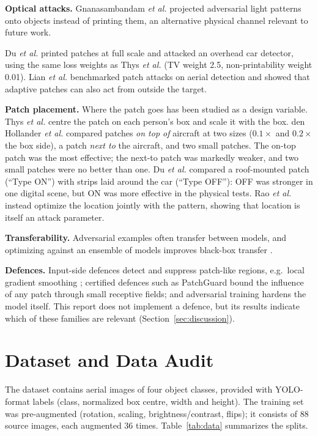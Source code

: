 \documentclass[conference]{IEEEtran}
\begin{document}
\textbf{Optical attacks.} Gnanasambandam \emph{et al.} \cite{gnanasambandam2021optical}
projected adversarial light patterns onto objects instead of printing them, an alternative
physical channel relevant to future work.

Du \emph{et al.} \cite{du2022physical} printed patches at full scale and attacked an overhead
car detector, using the same loss weights as Thys \emph{et al.} (TV weight 2.5,
non-printability weight 0.01). Lian \emph{et al.} \cite{lian2022benchmarking} benchmarked
patch attacks on aerial detection and showed that adaptive patches can also act from outside
the target.

\textbf{Patch placement.} Where the patch goes has been studied as a design variable. Thys
\emph{et al.} \cite{thys2019fooling} centre the patch on each person's box and scale it with
the box. den Hollander \emph{et al.} \cite{denhollander2020adversarial} compared patches
\emph{on top of} aircraft at two sizes ($0.1\times$ and $0.2\times$ the box side), a patch
\emph{next to} the aircraft, and two small patches. The on-top patch was the most effective;
the next-to patch was markedly weaker, and two small patches were no better than one. Du
\emph{et al.} \cite{du2022physical} compared a roof-mounted patch (``Type ON'') with strips
laid around the car (``Type OFF''): OFF was stronger in one digital scene, but ON was more
effective in the physical tests. Rao \emph{et al.} \cite{rao2020location} instead optimize the
location jointly with the pattern, showing that location is itself an attack parameter.

\textbf{Transferability.} Adversarial examples often transfer between models, and optimizing
against an ensemble of models improves black-box transfer \cite{liu2017delving}.

\textbf{Defences.} Input-side defences detect and suppress patch-like regions, e.g.\ local
gradient smoothing \cite{naseer2019local}; certified defences such as PatchGuard
\cite{xiang2021patchguard} bound the influence of any patch through small receptive fields;
and adversarial training \cite{madry2018towards,rao2020location} hardens the model itself.
This report does not implement a defence, but its results indicate which of these families
are relevant (Section~\ref{sec:discussion}).

\section{Dataset and Data Audit}
\label{sec:data}
The dataset contains aerial images of four object classes, provided with YOLO-format labels
(class, normalized box centre, width and height). The training set was pre-augmented
(rotation, scaling, brightness/contrast, flips); it consists of 88 source images, each
augmented 36 times. Table~\ref{tab:data} summarizes the splits.
\end{document}
